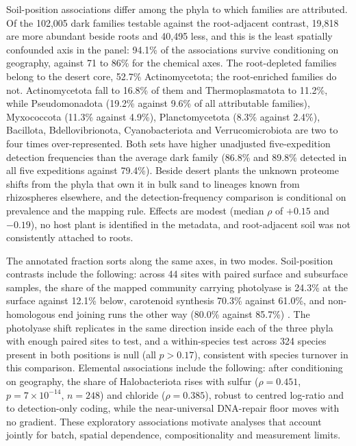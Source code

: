 \documentclass[11pt]{article}
\begin{document}
Soil-position associations differ among the phyla to which families are attributed. Of the 102{,}005 dark
families testable against the root-adjacent contrast, 19{,}818 are more abundant beside roots and
40{,}495 less, and this is the least spatially confounded axis in the panel: 94.1\% of the
associations survive conditioning on geography, against 71 to 86\% for the chemical axes. The
root-depleted families belong to the desert core, 52.7\% Actinomycetota; the root-enriched families
do not. Actinomycetota fall to 16.8\% of them and Thermoplasmatota to 11.2\%, while Pseudomonadota
(19.2\% against 9.6\% of all attributable families), Myxococcota (11.3\% against 4.9\%),
Planctomycetota (8.3\% against 2.4\%), Bacillota, Bdellovibrionota, Cyanobacteriota and
Verrucomicrobiota are two to four times over-represented. Both sets have higher unadjusted five-expedition detection frequencies than the average
dark family (86.8\% and 89.8\% detected in all five expeditions against 79.4\%). Beside desert plants
the unknown proteome shifts from the phyla that own it in bulk sand to lineages known from
rhizospheres elsewhere, and the detection-frequency comparison is conditional on prevalence and the mapping rule.
Effects are modest (median $\rho$ of $+0.15$ and $-0.19$), no host plant is identified in the
metadata, and root-adjacent soil was not consistently attached to roots.

The annotated fraction sorts along the same axes, in two modes. Soil-position contrasts include the following:
across 44 sites with paired surface and subsurface samples, the share of the mapped community
carrying photolyase is 24.3\% at the surface against 12.1\% below, carotenoid synthesis 70.3\%
against 61.0\%, and non-homologous end joining runs the other way (80.0\% against 85.7\%)
. The photolyase shift replicates in the same direction inside each of
the three phyla with enough paired sites to test, and a within-species test across 324 species
present in both positions is null (all $p > 0.17$), consistent with species turnover in this comparison. Elemental associations include the following: after conditioning on geography,
the share of Halobacteriota rises with sulfur ($\rho = 0.451$, $p = 7 \times 10^{-14}$, $n = 248$)
and chloride ($\rho = 0.385$), robust to centred log-ratio and to detection-only coding, while the
near-universal DNA-repair floor moves with no gradient. These exploratory associations motivate analyses that account jointly for batch, spatial dependence, compositionality and measurement limits.
\end{document}
